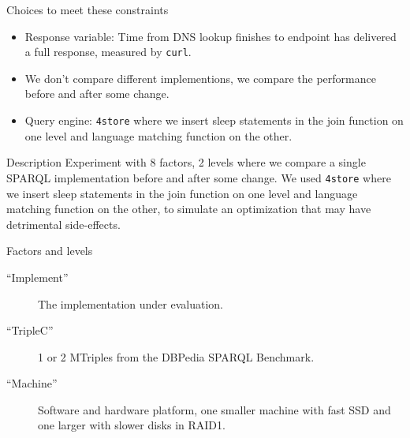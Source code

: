 \documentclass[english,usenames,dvipsnames,aspectratio=169]{beamer}
\begin{document}
\begin{frame}{Choices to meet these constraints}

  \begin{itemize}
  \item Response variable: Time from DNS lookup finishes to endpoint
    has delivered a full response, measured by \texttt{curl}.
  \item We don't compare different implementions, we compare the
    performance before and after some change.
  \item Query engine: \texttt{4store} where we insert \textsf{sleep}
    statements in the join function on one level and language matching
    function on the other. 
  \end{itemize}





\begin{block}{Description}
  Experiment with 8 factors, 2 levels where we compare a single SPARQL
  implementation before and after some change. We used \texttt{4store}
  where we insert \textsf{sleep} statements in the join function on
  one level and language matching function on the other, to simulate
  an optimization that may have detrimental side-effects.

\end{block}

\end{frame}


\begin{frame}{Factors and levels}
  \begin{description}
  \item [``Implement''] The implementation under evaluation.
  \item [``TripleC''] 1 or 2 MTriples from the DBPedia SPARQL
    Benchmark.
  \item [``Machine''] Software and hardware platform, one smaller
    machine with fast SSD and one larger with slower disks in RAID1.
  \end{description}
\end{frame}
\end{document}

